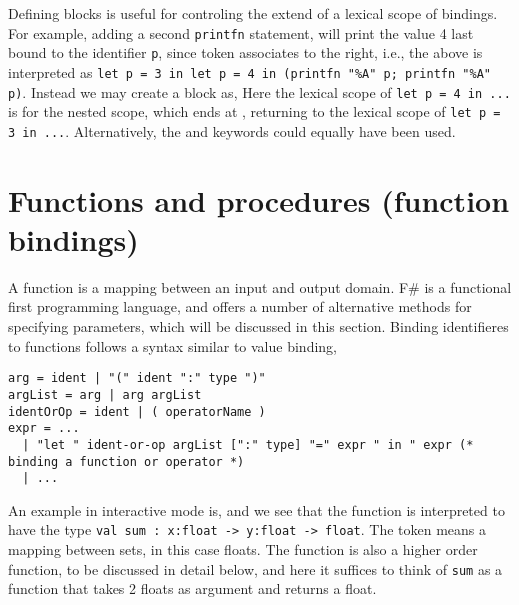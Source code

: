 Defining blocks is useful for controling the extend of a lexical scope of bindings. For example, adding a second \lstinline!printfn! statement,
%
%
will print the value 4 last bound to the identifier \lstinline!p!, since token \token{;} associates to the right, i.e., the above is interpreted as \lstinline!let p = 3 in let p = 4 in (printfn "%A" p; printfn "%A" p)!. Instead we may create a block as,
%
%
Here the lexical scope of \lstinline!let p = 4 in ...! is for the nested scope, which ends at \token{)}, returning to the lexical scope of \lstinline!let p = 3 in ...!. Alternatively, the  and  keywords could equally have been used.

\section{Functions and procedures (function bindings)}
\label{sec:functions}
A function is a mapping between an input and output domain. F\# is a functional first programming language, and offers a number of alternative methods for specifying parameters, which will be discussed in this section. Binding identifieres to functions follows a syntax similar to value binding,
%
\begin{lstlisting}[language=EBNF]
arg = ident | "(" ident ":" type ")"
argList = arg | arg argList
identOrOp = ident | ( operatorName )
expr = ... 
  | "let " ident-or-op argList [":" type] "=" expr " in " expr (* binding a function or operator *)
  | ...
\end{lstlisting}
An example in interactive mode is,
%
%
and we see that the function is interpreted to have the type \lstinline!val sum : x:float -> y:float -> float!. The \token{->} token means a mapping between sets, in this case floats. The function is also a higher order function, to be discussed in detail below, and here it suffices to think of \lstinline!sum! as a function that takes 2 floats as argument and returns a float.


